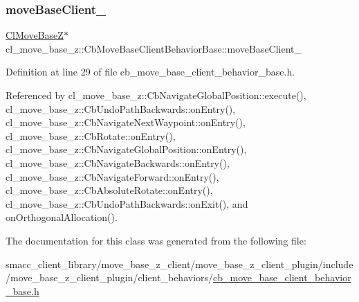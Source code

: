 \subsubsection{\texorpdfstring{move\+Base\+Client\+\_\+}{moveBaseClient\_}}
{\footnotesize\ttfamily \hyperlink{classcl__move__base__z_1_1ClMoveBaseZ}{Cl\+Move\+BaseZ}$\ast$ cl\+\_\+move\+\_\+base\+\_\+z\+::\+Cb\+Move\+Base\+Client\+Behavior\+Base\+::move\+Base\+Client\+\_\+\hspace{0.3cm}{\ttfamily [protected]}}



Definition at line 29 of file cb\+\_\+move\+\_\+base\+\_\+client\+\_\+behavior\+\_\+base.\+h.



Referenced by cl\+\_\+move\+\_\+base\+\_\+z\+::\+Cb\+Navigate\+Global\+Position\+::execute(), cl\+\_\+move\+\_\+base\+\_\+z\+::\+Cb\+Undo\+Path\+Backwards\+::on\+Entry(), cl\+\_\+move\+\_\+base\+\_\+z\+::\+Cb\+Navigate\+Next\+Waypoint\+::on\+Entry(), cl\+\_\+move\+\_\+base\+\_\+z\+::\+Cb\+Rotate\+::on\+Entry(), cl\+\_\+move\+\_\+base\+\_\+z\+::\+Cb\+Navigate\+Global\+Position\+::on\+Entry(), cl\+\_\+move\+\_\+base\+\_\+z\+::\+Cb\+Navigate\+Backwards\+::on\+Entry(), cl\+\_\+move\+\_\+base\+\_\+z\+::\+Cb\+Navigate\+Forward\+::on\+Entry(), cl\+\_\+move\+\_\+base\+\_\+z\+::\+Cb\+Absolute\+Rotate\+::on\+Entry(), cl\+\_\+move\+\_\+base\+\_\+z\+::\+Cb\+Undo\+Path\+Backwards\+::on\+Exit(), and on\+Orthogonal\+Allocation().



The documentation for this class was generated from the following file\+:\begin{DoxyCompactItemize}
\item 
smacc\+\_\+client\+\_\+library/move\+\_\+base\+\_\+z\+\_\+client/move\+\_\+base\+\_\+z\+\_\+client\+\_\+plugin/include/move\+\_\+base\+\_\+z\+\_\+client\+\_\+plugin/client\+\_\+behaviors/\hyperlink{cb__move__base__client__behavior__base_8h}{cb\+\_\+move\+\_\+base\+\_\+client\+\_\+behavior\+\_\+base.\+h}\end{DoxyCompactItemize}
